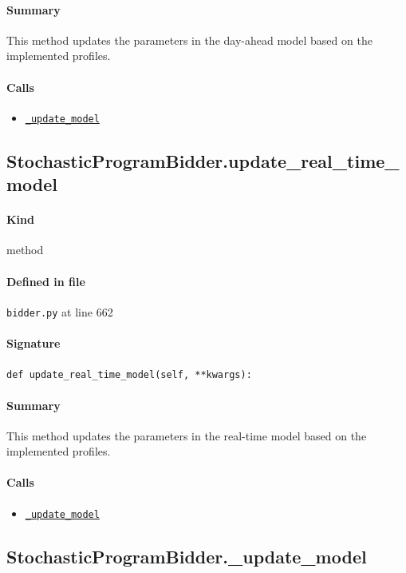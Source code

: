 \documentclass[11pt]{report}
\begin{document}
\paragraph{Summary} This method updates the parameters in the day-ahead model based on the implemented profiles.
\paragraph{Calls}
\begin{itemize}[leftmargin=*]
  \item \hyperref[def:bidder.py:StochasticProgramBidder._update_model:L675]{\texttt{\_update\_model}}
\end{itemize}
\subsection{StochasticProgramBidder.update\_real\_time\_model}
\label{def:bidder.py:StochasticProgramBidder.update_real_time_model:L662}
\paragraph{Kind} method
\paragraph{Defined in file} \texttt{bidder.py} at line 662
\paragraph{Signature} \texttt{def update\_real\_time\_model(self, **kwargs):}
\paragraph{Summary} This method updates the parameters in the real-time model based on the implemented profiles.
\paragraph{Calls}
\begin{itemize}[leftmargin=*]
  \item \hyperref[def:bidder.py:StochasticProgramBidder._update_model:L675]{\texttt{\_update\_model}}
\end{itemize}
\subsection{StochasticProgramBidder.\_update\_model}
\label{def:bidder.py:StochasticProgramBidder._update_model:L675}
\end{document}
